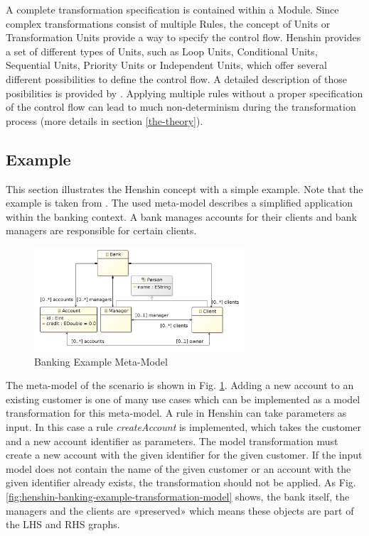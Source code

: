 \documentclass[runningheads]{llncs}
\begin{document}
A complete transformation specification is contained within a Module. Since complex transformations consist of multiple Rules, the concept of Units or Transformation Units provide a way to specify the control flow. Henshin provides a set of different types of Units, such as Loop Units, Conditional Units, Sequential Units, Priority Units or Independent Units, which offer several different possibilities to define the control flow. A detailed description of those posibilities is provided by \cite{henshin-units}. Applying multiple rules without a proper specification of the control flow can lead to much non-determinism during the transformation process (more details in section \ref{the-theory}).

\subsection{Example}\label{example}
This section illustrates the Henshin concept with a simple example. Note that the example is taken from \cite{henshin-banking-example}. The used meta-model describes a simplified application within the banking context. A bank manages accounts for their clients and bank managers are responsible for certain clients.

\begin{figure}[H]
	\centering
	\includegraphics[width=0.70\textwidth]{bank_example}
	\caption{Banking Example Meta-Model \cite{henshin-banking-example}}
	\label{fig:henshin-banking-example-meta-model}
\end{figure}

\noindent
The meta-model of the scenario is shown in Fig. \ref{fig:henshin-banking-example-meta-model}. Adding a new account to an existing customer is one of many use cases which can be implemented as a model transformation for this meta-model. A rule in Henshin can take parameters as input. In this case a rule \textit{createAccount} is implemented, which takes the customer and a new account identifier as parameters. The model transformation must create a new account with the given identifier for the given customer. If the input model does not contain the name of the given customer or an account with the given identifier already exists, the transformation should not be applied. As Fig. \ref{fig:henshin-banking-example-transformation-model} shows, the bank itself, the managers and the clients are «preserved» which means these objects are part of the LHS and RHS graphs.
\end{document}
